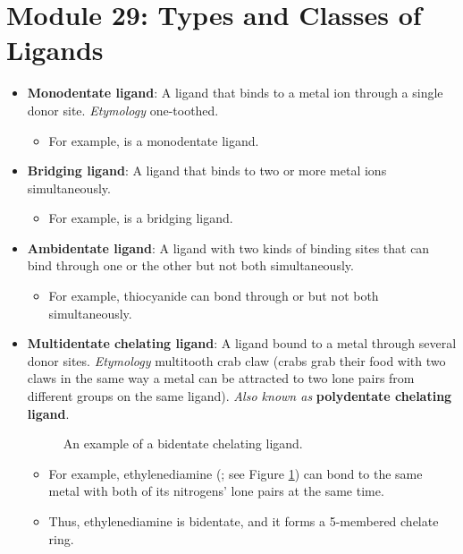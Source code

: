 \documentclass[../notes.tex]{subfiles}
\begin{document}
\section{Module 29: Types and Classes of Ligands}
\begin{itemize}
    \item \textbf{Monodentate ligand}: A ligand that binds to a metal ion through a single donor site. \emph{Etymology} one-toothed.
    \begin{itemize}
        \item For example,  is a monodentate ligand.
    \end{itemize}
    \item \textbf{Bridging ligand}: A ligand that binds to two or more metal ions simultaneously.
    \begin{itemize}
        \item For example,  is a bridging ligand.
    \end{itemize}
    \item \textbf{Ambidentate ligand}: A ligand with two kinds of binding sites that can bind through one or the other but not both simultaneously.
    \begin{itemize}
        \item For example, thiocyanide can bond through  or  but not both simultaneously.
    \end{itemize}
    \item \textbf{Multidentate chelating ligand}: A ligand bound to a metal through several donor sites. \emph{Etymology} multitooth crab claw (crabs grab their food with two claws in the same way a metal can be attracted to two lone pairs from different groups on the same ligand). \emph{Also known as} \textbf{polydentate chelating ligand}.
    \begin{figure}[H]
        \centering
        \caption{An example of a bidentate chelating ligand.}
        \label{fig:bidentateLigand}
    \end{figure}
    \begin{itemize}
        \item For example, ethylenediamine (; see Figure \ref{fig:bidentateLigand}) can bond to the same metal with both of its nitrogens' lone pairs at the same time.
        \item Thus, ethylenediamine is bidentate, and it forms a 5-membered chelate ring.

\end{itemize}
\end{itemize}
\end{document}
